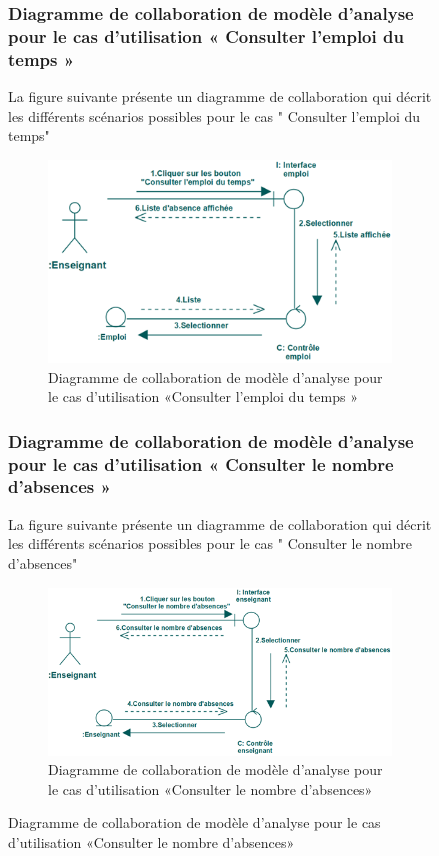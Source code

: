 \documentclass[12 pt]{report}
\begin{document}
\begin{figure}[h]
\begin{center}
\subsubsection{Diagramme  de  collaboration  de  modèle  d'analyse  pour  le  cas  d'utilisation « Consulter l'emploi du temps »  }
La figure suivante présente un diagramme de collaboration qui décrit les différents
scénarios possibles pour le cas " Consulter l'emploi du temps"
\begin{figure}[h]
\begin{center}
\includegraphics[width= 14cm , height =5 cm]{colla_ens_consulteremploi.PNG}
 \caption{Diagramme  de  collaboration  de  modèle  d'analyse  pour  le  cas  d'utilisation «Consulter l'emploi du temps »}
\end{center}
\end{figure}
\subsubsection{Diagramme  de  collaboration  de  modèle  d'analyse  pour  le  cas  d'utilisation « Consulter le nombre d'absences »  }
La figure suivante présente un diagramme de collaboration qui décrit les différents
scénarios possibles pour le cas " Consulter le nombre d'absences"
\begin{figure}[h]
\begin{center}
\includegraphics[width= 14cm , height =5 cm]{colla_ens_consulternombreabsence.PNG}
 \caption{Diagramme  de  collaboration  de  modèle  d'analyse  pour  le  cas  d'utilisation «Consulter le nombre d'absences»}
\end{center}
\end{figure}


\end{center}
\end{figure}
\end{document}

